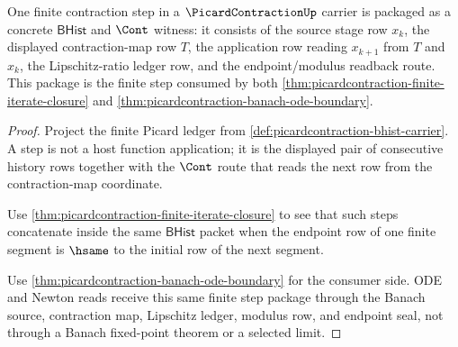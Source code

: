 \begin{theorem}
\label{thm:picardcontraction-contraction-step-package}
One finite contraction step in a $\PicardContractionUp$ carrier is packaged as a concrete $\mathsf{BHist}$ and $\Cont$ witness: it consists of the source stage row $x_k$, the displayed contraction-map row $T$, the application row reading $x_{k+1}$ from $T$ and $x_k$, the Lipschitz-ratio ledger row, and the endpoint/modulus readback route. This package is the finite step consumed by both \autoref{thm:picardcontraction-finite-iterate-closure} and \autoref{thm:picardcontraction-banach-ode-boundary}.
\end{theorem}
\begin{proof}
Project the finite Picard ledger from \autoref{def:picardcontraction-bhist-carrier}. A step is not a host function application; it is the displayed pair of consecutive history rows together with the $\Cont$ route that reads the next row from the contraction-map coordinate.

Use \autoref{thm:picardcontraction-finite-iterate-closure} to see that such steps concatenate inside the same $\mathsf{BHist}$ packet when the endpoint row of one finite segment is $\hsame$ to the initial row of the next segment.

Use \autoref{thm:picardcontraction-banach-ode-boundary} for the consumer side. ODE and Newton reads receive this same finite step package through the Banach source, contraction map, Lipschitz ledger, modulus row, and endpoint seal, not through a Banach fixed-point theorem or a selected limit.
\end{proof}

